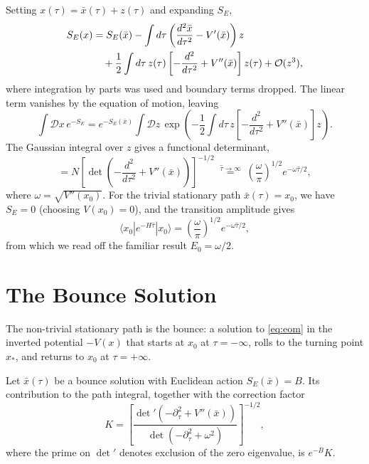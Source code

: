 Setting $x(\tau) = \bar x(\tau) + z(\tau)$ and expanding $S_E$,
\begin{align}
    S_E(x) &= S_E(\bar x)
    - \int d\tau\left(\frac{d^2\bar x}{d\tau^2} - V'(\bar x)\right)z
    \notag\\
    &\quad+ \frac{1}{2}\int d\tau\,z(\tau)
    \left[-\frac{d^2}{d\tau^2} + V''(\bar x)\right]z(\tau)
    + \mathcal{O}(z^3),
\end{align}
where integration by parts was used and boundary terms dropped. The
linear term vanishes by the equation of motion, leaving
\begin{equation}
    \int\mathcal{D}x\,e^{-S_E}
    = e^{-S_E(\bar x)}\int\mathcal{D}z\,
    \exp\!\left(-\frac{1}{2}\int d\tau\,z
    \left[-\frac{d^2}{d\tau^2}+V''(\bar x)\right]z\right).
\end{equation}
The Gaussian integral over $z$ gives a functional determinant,
\begin{equation}
    = N\left[\det\!\left(-\frac{d^2}{d\tau^2}
    + V''(\bar x)\right)\right]^{-1/2}
    \;\overset{\hat\tau\to\infty}{=}\;
    \left(\frac{\omega}{\pi}\right)^{1/2}e^{-\omega\hat\tau/2},
\end{equation}
where $\omega = \sqrt{V''(x_0)}$. For the trivial stationary path
$\bar x(\tau) = x_0$, we have $S_E = 0$ (choosing $V(x_0) = 0$),
and the transition amplitude gives
\begin{equation}
    \langle x_0|e^{-H\hat\tau}|x_0\rangle
    = \left(\frac{\omega}{\pi}\right)^{1/2}e^{-\omega\hat\tau/2},
\end{equation}
from which we read off the familiar result $E_0 = \omega/2$.

\section{The Bounce Solution}

The non-trivial stationary path is the bounce: a solution to
\eqref{eq:eom} in the inverted potential $-V(x)$ that starts at $x_0$
at $\tau = -\infty$, rolls to the turning point $x_*$, and returns to
$x_0$ at $\tau = +\infty$.


Let $\bar x(\tau)$ be a bounce solution with Euclidean action
$S_E(\bar x) = B$. Its contribution to the path integral, together
with the correction factor
\begin{equation}
    K = \left[\frac{\det'(-\partial_\tau^2 + V''(\bar x))}
    {\det(-\partial_\tau^2 + \omega^2)}\right]^{-1/2},
\end{equation}
where the prime on $\det'$ denotes exclusion of the zero eigenvalue,
is $e^{-B}K$.

